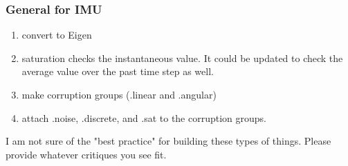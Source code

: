 \documentclass[]{BasiliskReportMemo}
\begin{document}
\subsubsection{General for IMU}
\begin{enumerate}
	\item convert to Eigen
	\item saturation checks the instantaneous value. It could be updated to check the average value over the past time step as well.
	\item make corruption groups (.linear and .angular)
	\item attach .noise, .discrete, and .sat to the corruption groups.
\end{enumerate}

I am not sure of the "best practice" for building these types of things. Please provide whatever critiques you see fit. 





\end{document}
